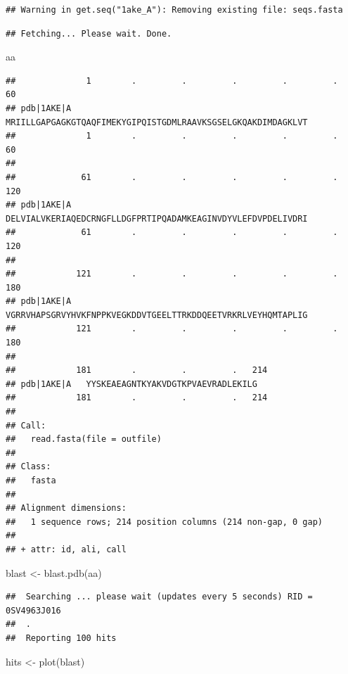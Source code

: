 \documentclass[
]{article}
\newenvironment{Shaded}{\begin{snugshade}}{\end{snugshade}}
\newcommand{\FunctionTok}[1]{\textcolor[rgb]{0.00,0.00,0.00}{#1}}
\newcommand{\NormalTok}[1]{#1}
\newcommand{\OtherTok}[1]{\textcolor[rgb]{0.56,0.35,0.01}{#1}}
\begin{document}
\begin{verbatim}
## Warning in get.seq("1ake_A"): Removing existing file: seqs.fasta
\end{verbatim}

\begin{verbatim}
## Fetching... Please wait. Done.
\end{verbatim}

\begin{Shaded}
\begin{Highlighting}[]
\NormalTok{aa}
\end{Highlighting}
\end{Shaded}

\begin{verbatim}
##              1        .         .         .         .         .         60 
## pdb|1AKE|A   MRIILLGAPGAGKGTQAQFIMEKYGIPQISTGDMLRAAVKSGSELGKQAKDIMDAGKLVT
##              1        .         .         .         .         .         60 
## 
##             61        .         .         .         .         .         120 
## pdb|1AKE|A   DELVIALVKERIAQEDCRNGFLLDGFPRTIPQADAMKEAGINVDYVLEFDVPDELIVDRI
##             61        .         .         .         .         .         120 
## 
##            121        .         .         .         .         .         180 
## pdb|1AKE|A   VGRRVHAPSGRVYHVKFNPPKVEGKDDVTGEELTTRKDDQEETVRKRLVEYHQMTAPLIG
##            121        .         .         .         .         .         180 
## 
##            181        .         .         .   214 
## pdb|1AKE|A   YYSKEAEAGNTKYAKVDGTKPVAEVRADLEKILG
##            181        .         .         .   214 
## 
## Call:
##   read.fasta(file = outfile)
## 
## Class:
##   fasta
## 
## Alignment dimensions:
##   1 sequence rows; 214 position columns (214 non-gap, 0 gap) 
## 
## + attr: id, ali, call
\end{verbatim}

\begin{Shaded}
\begin{Highlighting}[]
\NormalTok{blast }\OtherTok{\textless{}{-}} \FunctionTok{blast.pdb}\NormalTok{(aa)}
\end{Highlighting}
\end{Shaded}

\begin{verbatim}
##  Searching ... please wait (updates every 5 seconds) RID = 0SV4963J016 
##  .
##  Reporting 100 hits
\end{verbatim}

\begin{Shaded}
\begin{Highlighting}[]
\NormalTok{hits }\OtherTok{\textless{}{-}} \FunctionTok{plot}\NormalTok{(blast)}
\end{Highlighting}
\end{Shaded}
\end{document}
